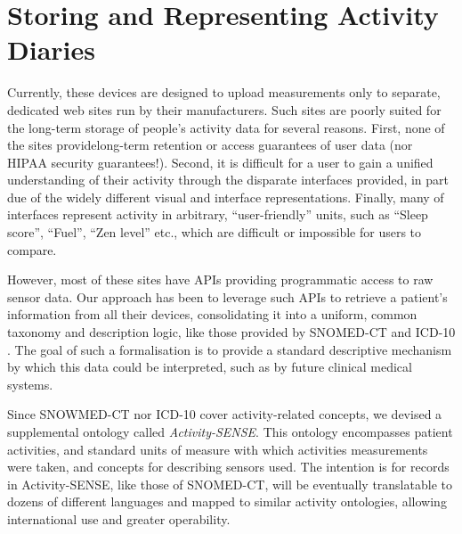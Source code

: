 \documentclass{chi-ext}
\begin{document}


\section{Storing and Representing Activity Diaries}
Currently, these devices are designed to upload measurements only to separate, dedicated web sites run by their manufacturers.  Such sites are poorly suited for the long-term storage of people's activity data for several reasons.  First, none of the sites providelong-term retention or access guarantees of user data (nor HIPAA security guarantees!).  Second, it is difficult for a user to gain a unified understanding of their activity through the disparate interfaces provided, in part due of the widely different visual and interface representations. Finally, many of interfaces represent activity in arbitrary, ``user-friendly'' units, such as ``Sleep score'', ``Fuel'', ``Zen level'' etc., which are difficult or impossible for users to compare.

However, most of these sites have APIs providing programmatic access to raw sensor data.  Our approach has been to leverage such APIs to retrieve a patient's information from all their devices, consolidating it into a uniform, common taxonomy and description logic, like those provided by SNOMED-CT \cite{stearns2001snomed} and ICD-10 \cite{world1993icd}.  The goal of such a formalisation is to provide a standard descriptive mechanism by which this data could be interpreted, such as by future clinical medical systems. 

Since SNOWMED-CT nor ICD-10 cover activity-related concepts, we devised a supplemental ontology called \emph{Activity-SENSE}.  This ontology encompasses patient activities, and standard units of measure with which activities measurements were taken, and concepts for describing sensors used.  The intention is for records in Activity-SENSE, like those of SNOMED-CT, will be eventually translatable to dozens of different languages and mapped to similar activity ontologies, allowing international use and greater operability.
\end{document}
